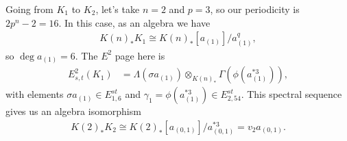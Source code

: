 \begin{example}\label{ex:labelname} Going from $K_1$ to $K_2$, let's take $n=2$ and $p=3$, so our periodicity is $2p^n-2 = 16$. In this case, as an algebra we have
\begin{align*}
    K(n)_\ast K_1 \cong K(n)_\ast \left[ a_{(1)} \right]\big/ a_{(1)}^q,
\end{align*}
so $\deg a_{(1)} = 6$. The $E^2$ page here is
\begin{align*}
    E_{s,t}^2(K_1) &= \Lambda \left( \sigma a_{(1)} \right) \otimes_{K(n)_\ast} \Gamma \left( \phi \left( a_{(1)}^{\ast 3} \right) \right),
\end{align*}
with elements $\sigma a_{(1)} \in E_{1,6}^{st}$ and $\gamma_1 = \phi \left( a_{(1)}^{\ast 3} \right) \in E_{2,54}^{st}$. This spectral sequence gives us an algebra isomorphism
\begin{align*}
    K(2)_\ast K_2 \cong K(2)_\ast \left[ a_{(0,1)} \right] \big/ a_{(0,1)}^{\ast 3} = v_2 a_{(0,1)}.
\end{align*}
\end{example}

